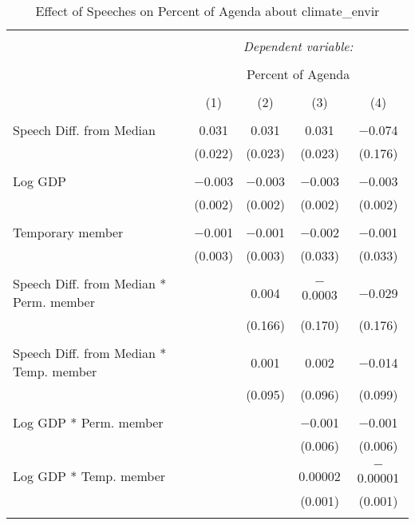 
\begin{table}[!htbp] \centering 
  \caption{Effect of Speeches on Percent of Agenda about  climate_envir} 
  \label{} 
\begin{tabular}{@{\extracolsep{5pt}}lcccc} 
\\[-1.8ex]\hline 
\hline \\[-1.8ex] 
 & \multicolumn{4}{c}{\textit{Dependent variable:}} \\ 
\cline{2-5} 
\\[-1.8ex] & \multicolumn{4}{c}{Percent of Agenda} \\ 
\\[-1.8ex] & (1) & (2) & (3) & (4)\\ 
\hline \\[-1.8ex] 
 Speech Diff. from Median & 0.031 & 0.031 & 0.031 & $-$0.074 \\ 
  & (0.022) & (0.023) & (0.023) & (0.176) \\ 
  & & & & \\ 
 Log GDP & $-$0.003 & $-$0.003 & $-$0.003 & $-$0.003 \\ 
  & (0.002) & (0.002) & (0.002) & (0.002) \\ 
  & & & & \\ 
 Temporary member & $-$0.001 & $-$0.001 & $-$0.002 & $-$0.001 \\ 
  & (0.003) & (0.003) & (0.033) & (0.033) \\ 
  & & & & \\ 
 Speech Diff. from Median * Perm. member &  & 0.004 & $-$0.0003 & $-$0.029 \\ 
  &  & (0.166) & (0.170) & (0.176) \\ 
  & & & & \\ 
 Speech Diff. from Median * Temp. member &  & 0.001 & 0.002 & $-$0.014 \\ 
  &  & (0.095) & (0.096) & (0.099) \\ 
  & & & & \\ 
 Log GDP * Perm. member &  &  & $-$0.001 & $-$0.001 \\ 
  &  &  & (0.006) & (0.006) \\ 
  & & & & \\ 
 Log GDP * Temp. member &  &  & 0.00002 & $-$0.00001 \\ 
  &  &  & (0.001) & (0.001) \\ 
  & & & & \\ 

\end{tabular}
\end{table}
